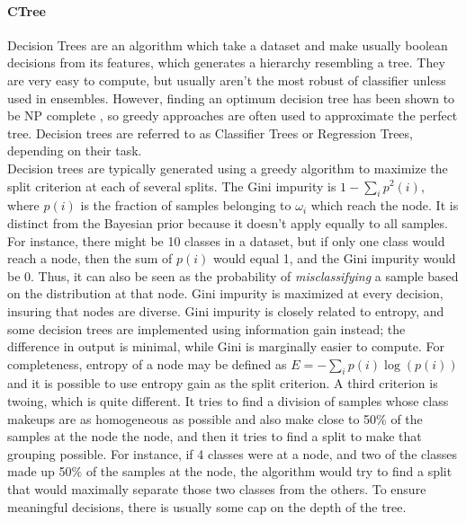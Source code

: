 \paragraph{CTree}
Decision Trees are an algorithm which take a dataset and make usually boolean decisions from its features, which generates a hierarchy resembling a tree.  They are very easy to compute, but usually aren't the most robust of classifier unless used in ensembles.  However, finding an optimum decision tree has been shown to be NP complete \citep{hyafil_constructing_1976}, so greedy approaches are often used to approximate the perfect tree.  Decision trees are referred to as Classifier Trees or Regression Trees, depending on their task.\\
Decision trees are typically generated using a greedy algorithm to maximize the split criterion at each of several splits.  The Gini impurity is $1-\sum_{i}p^2(i)$, where $p(i)$ is the fraction of samples belonging to $\omega_i$ which reach the node.  It is distinct from the Bayesian prior because it doesn't apply equally to all samples.  For instance, there might be 10 classes in a dataset, but if only one class would reach a node, then the sum of $p(i)$ would equal 1, and the Gini impurity would be 0. Thus, it can also be seen as the probability of \textit{misclassifying} a sample based on the distribution at that node. Gini impurity is maximized at every decision, insuring that nodes are diverse.  Gini impurity is closely related to entropy, and some decision trees are implemented using information gain instead; the difference in output is minimal, while Gini is marginally easier to compute.  For completeness, entropy of a node may be defined as $E=-\sum_{i}p(i)\log(p(i))$ and it is possible to use entropy gain as the split criterion.  A third criterion is twoing, which is quite different.  It tries to find a division of samples whose class makeups are as homogeneous as possible and also make close to 50\% of the samples at the node the node, and then it tries to find a split to make that grouping possible.  For instance, if 4 classes were at a node, and two of the classes made up 50\% of the samples at the node, the algorithm would try to find a split that would maximally separate those two classes from the others.  To ensure meaningful decisions, there is usually some cap on the depth of the tree.
\\
